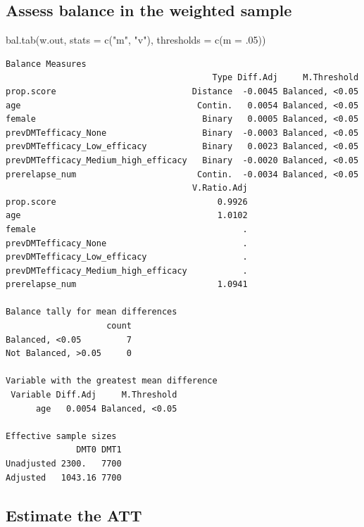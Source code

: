 \documentclass[
  letterpaper,
  DIV=11,
  numbers=noendperiod]{scrreprt}
\newenvironment{Shaded}{\begin{snugshade}}{\end{snugshade}}
\newcommand{\AttributeTok}[1]{\textcolor[rgb]{0.40,0.45,0.13}{#1}}
\newcommand{\DecValTok}[1]{\textcolor[rgb]{0.68,0.00,0.00}{#1}}
\newcommand{\FunctionTok}[1]{\textcolor[rgb]{0.28,0.35,0.67}{#1}}
\newcommand{\NormalTok}[1]{\textcolor[rgb]{0.00,0.23,0.31}{#1}}
\newcommand{\StringTok}[1]{\textcolor[rgb]{0.13,0.47,0.30}{#1}}
\begin{document}
\hypertarget{assess-balance-in-the-weighted-sample}{%
\subsection{Assess balance in the weighted
sample}\label{assess-balance-in-the-weighted-sample}}

\begin{Shaded}
\begin{Highlighting}[]
\FunctionTok{bal.tab}\NormalTok{(w.out, }\AttributeTok{stats =} \FunctionTok{c}\NormalTok{(}\StringTok{"m"}\NormalTok{, }\StringTok{"v"}\NormalTok{), }\AttributeTok{thresholds =} \FunctionTok{c}\NormalTok{(}\AttributeTok{m =}\NormalTok{ .}\DecValTok{05}\NormalTok{))}
\end{Highlighting}
\end{Shaded}

\begin{verbatim}
Balance Measures
                                         Type Diff.Adj     M.Threshold
prop.score                           Distance  -0.0045 Balanced, <0.05
age                                   Contin.   0.0054 Balanced, <0.05
female                                 Binary   0.0005 Balanced, <0.05
prevDMTefficacy_None                   Binary  -0.0003 Balanced, <0.05
prevDMTefficacy_Low_efficacy           Binary   0.0023 Balanced, <0.05
prevDMTefficacy_Medium_high_efficacy   Binary  -0.0020 Balanced, <0.05
prerelapse_num                        Contin.  -0.0034 Balanced, <0.05
                                     V.Ratio.Adj
prop.score                                0.9926
age                                       1.0102
female                                         .
prevDMTefficacy_None                           .
prevDMTefficacy_Low_efficacy                   .
prevDMTefficacy_Medium_high_efficacy           .
prerelapse_num                            1.0941

Balance tally for mean differences
                    count
Balanced, <0.05         7
Not Balanced, >0.05     0

Variable with the greatest mean difference
 Variable Diff.Adj     M.Threshold
      age   0.0054 Balanced, <0.05

Effective sample sizes
              DMT0 DMT1
Unadjusted 2300.   7700
Adjusted   1043.16 7700
\end{verbatim}

\hypertarget{estimate-the-att}{%
\subsection{Estimate the ATT}\label{estimate-the-att}}
\end{document}
